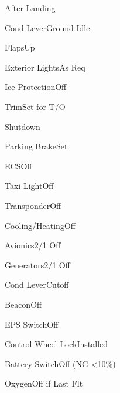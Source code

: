 \documentclass[sim-use, halfpage]{checklist}
\begin{document}
\begin{checklist}{After Landing}
  \item{Cond Lever}{Ground Idle}
  \item{Flaps}{Up}
  \item{Exterior Lights}{As Req}
  \item{Ice Protection}{Off}
  \item{Trim}{Set for T/O}
\end{checklist}

\begin{checklist}{Shutdown}
  \item{Parking Brake}{Set}
  \item{ECS}{Off}
  \item{Taxi Light}{Off}
  \item{Transponder}{Off}
  \item{Cooling/Heating}{Off}
  \item{Avionics}{2/1 Off}
  \item{Generators}{2/1 Off}
  \item{Cond Lever}{Cutoff}
  \item{Beacon}{Off}
  \item{EPS Switch}{Off}
  \item{Control Wheel Lock}{Installed}
  \item{Battery Switch}{Off (NG <10\%)}
  \item{Oxygen}{Off if Last Flt}
\end{checklist}
\end{document}
